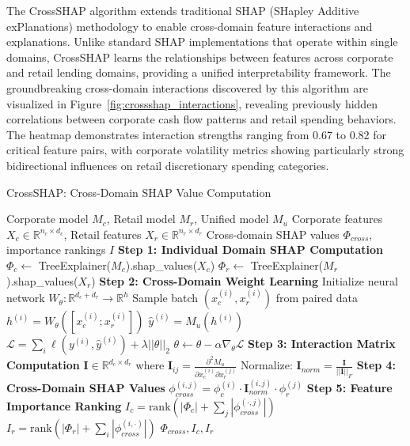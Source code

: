 \documentclass[a4paper,11pt,twoside]{article}
\newcommand{\0}{\Bf{0}}
\theoremstyle{definition}
\begin{document}
The CrossSHAP algorithm extends traditional SHAP (SHapley Additive exPlanations) methodology to enable cross-domain feature interactions and explanations. Unlike standard SHAP implementations that operate within single domains, CrossSHAP learns the relationships between features across corporate and retail lending domains, providing a unified interpretability framework. The groundbreaking cross-domain interactions discovered by this algorithm are visualized in Figure~\ref{fig:crossshap_interactions}, revealing previously hidden correlations between corporate cash flow patterns and retail spending behaviors. The heatmap demonstrates interaction strengths ranging from 0.67 to 0.82 for critical feature pairs, with corporate volatility metrics showing particularly strong bidirectional influences on retail discretionary spending categories.

\begin{algorithm}
\caption{CrossSHAP: Cross-Domain SHAP Value Computation}
\label{alg:crossshap}
\begin{algorithmic}[1]
\Require Corporate model $M_c$, Retail model $M_r$, Unified model $M_u$
\Require Corporate features $X_c \in \mathbb{R}^{n_c \times d_c}$, Retail features $X_r \in \mathbb{R}^{n_r \times d_r}$
\Ensure Cross-domain SHAP values $\Phi_{cross}$, importance rankings $I$
\State \textbf{Step 1: Individual Domain SHAP Computation}
\State $\Phi_c \leftarrow$ TreeExplainer($M_c$).shap\_values($X_c$)
\State $\Phi_r \leftarrow$ TreeExplainer($M_r$).shap\_values($X_r$)
\State \textbf{Step 2: Cross-Domain Weight Learning}
\State Initialize neural network $W_{\theta}: \mathbb{R}^{d_c + d_r} \rightarrow \mathbb{R}^{h}$
    \State Sample batch $(x_c^{(i)}, x_r^{(i)})$ from paired data
    \State $h^{(i)} = W_{\theta}([x_c^{(i)}; x_r^{(i)}])$ 
    \State $\hat{y}^{(i)} = M_u(h^{(i)})$ 
    \State $\mathcal{L} = \sum_i \ell(y^{(i)}, \hat{y}^{(i)}) + \lambda ||\theta||_2$
    \State $\theta \leftarrow \theta - \alpha \nabla_{\theta} \mathcal{L}$ 
\EndFor
\State \textbf{Step 3: Interaction Matrix Computation}
\State $\mathbf{I} \in \mathbb{R}^{d_c \times d_r}$ where $\mathbf{I}_{ij} = \frac{\partial^2 M_u}{\partial x_c^{(i)} \partial x_r^{(j)}}$
\State Normalize: $\mathbf{I}_{norm} = \frac{\mathbf{I}}{||\mathbf{I}||_F}$
\State \textbf{Step 4: Cross-Domain SHAP Values}
    \State $\phi_{cross}^{(i,j)} = \phi_c^{(i)} \cdot \mathbf{I}_{norm}^{(i,j)} \cdot \phi_r^{(j)}$
\EndFor
\State \textbf{Step 5: Feature Importance Ranking}
\State $I_c = \text{rank}(|\Phi_c| + \sum_j |\phi_{cross}^{(\cdot,j)}|)$ 
\State $I_r = \text{rank}(|\Phi_r| + \sum_i |\phi_{cross}^{(i,\cdot)}|)$ 
\State \Return $\Phi_{cross}, I_c, I_r$
\end{algorithmic}
\end{algorithm}
\end{document}
